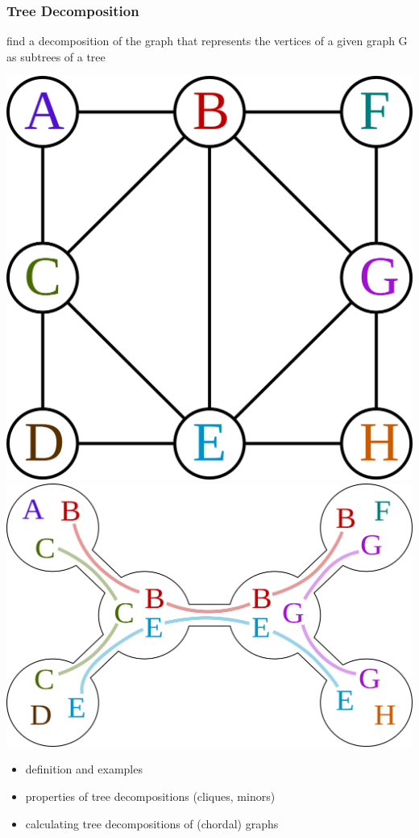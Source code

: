 \documentclass[titlepage,german,presentation]{beamer}
\begin{document}
\begin{frame}
\frametitle{Tree Decomposition}
\begin{block}{}
  find a decomposition of the graph that represents the vertices of a given graph G as subtrees of a tree
\end{block}
\begin{center}
\includegraphics[height=0.37\textheight]{my_tree_3.png}\qquad
\includegraphics[height=0.37\textheight]{my_tree_4.png}
\end{center}

\begin{itemize}
\item definition and examples~\cite{krumke09}
\medskip
\item properties of tree decompositions (cliques, minors)~\cite{krumke09}
\medskip
\item calculating tree decompositions of (chordal) graphs~\cite{krumke09}
\end{itemize}

\end{frame}
\end{document}
